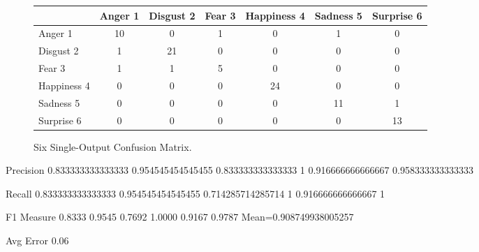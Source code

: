 \documentclass[a4paper,11pt]{article}
\begin{document}
\begin{figure}[h]                                                               
\begin{center}                                                                  
     \begin{tabular}{ | l || c | c | c | c | c | c | }                           
     \hline                                                                      
           & Anger 1 & Disgust 2 & Fear 3 & Happiness 4 & Sadness 5 & Surprise 6 \\ \hline \hline
         Anger 1 		& 10 & 0 & 1 & 0 & 1 & 0 \\ \hline                               
         Disgust 2 		& 1 & 21 & 0 & 0 & 0 & 0 \\ \hline                            
         Fear 3 		& 1 & 1 & 5 & 0 & 0 & 0 \\ \hline                                
         Happiness 4 	& 0 & 0 & 0 & 24 & 0 & 0 \\ \hline                          
         Sadness 5 		& 0 & 0 & 0 & 0 & 11 & 1 \\ \hline                             
         Surprise 6 	& 0 & 0 & 0 & 0 & 0 & 13 \\ \hline                           
     \end{tabular}                                                               
     \caption{Six Single-Output Confusion Matrix.}
     \label{fig:sixConfusionMatrix}                                                 
\end{center}                                                                    
\end{figure}

Precision
0.833333333333333	0.954545454545455	0.833333333333333	1	0.916666666666667	0.958333333333333

Recall
0.833333333333333	0.954545454545455	0.714285714285714	1	0.916666666666667	1

F1 Measure
0.8333    0.9545    0.7692    1.0000    0.9167    0.9787 Mean=0.908749938005257

Avg Error
0.06
\end{document}
